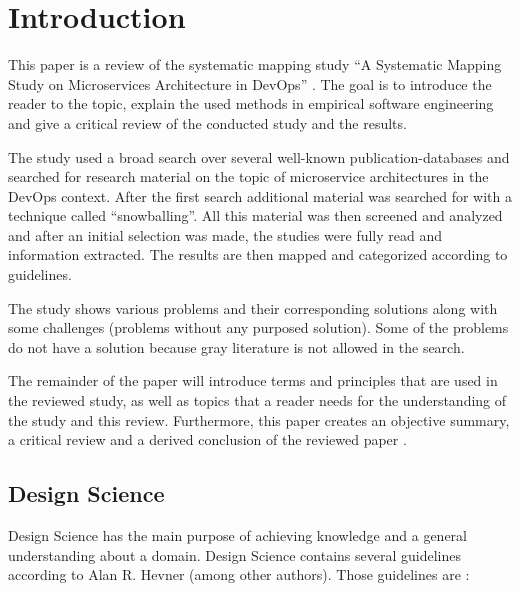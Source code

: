 \section{Introduction}
\label{sec:introduction}

This paper is a review of the systematic mapping study
``A Systematic Mapping Study on Microservices Architecture in DevOps'' \cite{waseem:SMSMSADevOps}.
The goal is to introduce the reader to the topic, explain the used
methods in empirical software engineering and give a critical review
of the conducted study and the results.

The study used a broad search over several well-known publication-databases
and searched for research material on the topic of microservice architectures
in the DevOps context. After the first search additional material
was searched for with a technique called ``snowballing''. All this material
was then screened and analyzed and after an initial selection was made,
the studies were fully read and information extracted. The results
are then mapped and categorized according to guidelines.

The study shows various problems and their corresponding solutions
along with some challenges (problems without any purposed solution).
Some of the problems do not have a solution because gray literature is
not allowed in the search.

The remainder of the paper will introduce terms and principles that are used
in the reviewed study, as well as topics that a reader needs for the understanding
of the study and this review. Furthermore, this paper creates an objective summary,
a critical review and a derived conclusion of the reviewed paper \cite{waseem:SMSMSADevOps}.

\subsection{Design Science}

Design Science has the main purpose of achieving knowledge and a general understanding
about a domain. Design Science contains several guidelines
according to Alan R. Hevner (among other authors). Those guidelines are \cite{hevner:DesignScience}:

